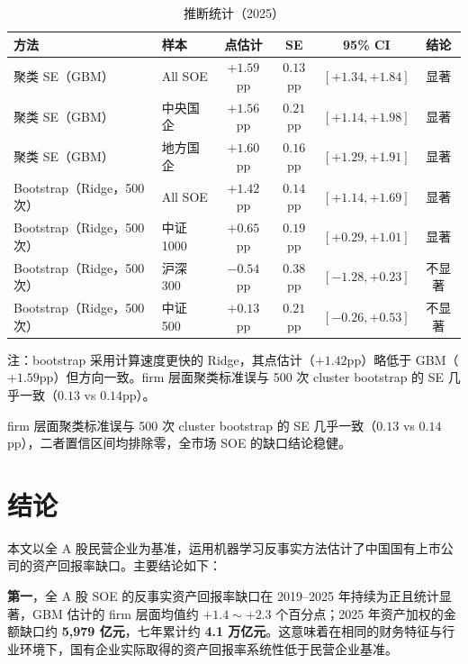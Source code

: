 \documentclass[11pt,a4paper]{ctexart}
\begin{document}
\begin{table}[htbp]
\centering
\caption{推断统计（2025）}
\label{tab:inference}
\begin{threeparttable}
\small
\begin{tabular}{llcccc}
\toprule
方法 & 样本 & 点估计 & SE & 95\% CI & 结论 \\
\midrule
聚类 SE（GBM） & All SOE & $+1.59$pp & $0.13$pp & $[+1.34,+1.84]$ & 显著 \\
聚类 SE（GBM） & 中央国企 & $+1.56$pp & $0.21$pp & $[+1.14,+1.98]$ & 显著 \\
聚类 SE（GBM） & 地方国企 & $+1.60$pp & $0.16$pp & $[+1.29,+1.91]$ & 显著 \\
Bootstrap（Ridge，500 次） & All SOE & $+1.42$pp & $0.14$pp & $[+1.14,+1.69]$ & 显著 \\
Bootstrap（Ridge，500 次） & 中证 1000 & $+0.65$pp & $0.19$pp & $[+0.29,+1.01]$ & 显著 \\
Bootstrap（Ridge，500 次） & 沪深 300 & $-0.54$pp & $0.38$pp & $[-1.28,+0.23]$ & 不显著 \\
Bootstrap（Ridge，500 次） & 中证 500 & $+0.13$pp & $0.21$pp & $[-0.26,+0.53]$ & 不显著 \\
\bottomrule
\end{tabular}
\begin{tablenotes}
\footnotesize\raggedright
\item 注：bootstrap 采用计算速度更快的 Ridge，其点估计（$+1.42$pp）略低于 GBM（$+1.59$pp）但方向一致。firm 层面聚类标准误与 500 次 cluster bootstrap 的 SE 几乎一致（$0.13$ vs $0.14$pp）。
\end{tablenotes}
\end{threeparttable}
\end{table}

firm 层面聚类标准误与 500 次 cluster bootstrap 的 SE 几乎一致（$0.13$ vs $0.14$pp），二者置信区间均排除零，全市场 SOE 的缺口结论稳健。

\section{结论}

本文以全 A 股民营企业为基准，运用机器学习反事实方法估计了中国国有上市公司的资产回报率缺口。主要结论如下：

\textbf{第一}，全 A 股 SOE 的反事实资产回报率缺口在 2019--2025 年持续为正且统计显著，GBM 估计的 firm 层面均值约 $+1.4\sim+2.3$ 个百分点；2025 年资产加权的金额缺口约 \textbf{5{,}979 亿元}，七年累计约 \textbf{4.1 万亿元}。这意味着在相同的财务特征与行业环境下，国有企业实际取得的资产回报率系统性低于民营企业基准。
\end{document}
